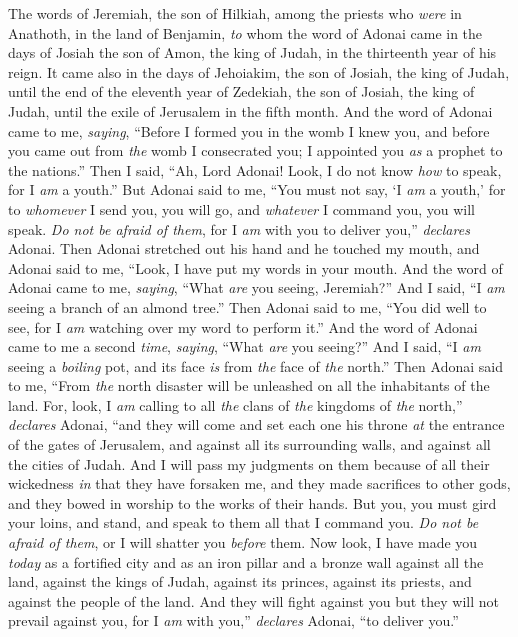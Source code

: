 
\begin{biblechapter} %
 The words of Jeremiah, the son of Hilkiah, among the priests who \textit{were} in Anathoth, in the land of Benjamin,
\verse \textit{to} whom the word of Adonai came in the days of Josiah the son of Amon, the king of Judah, in the thirteenth year of his reign.
\verse It came also in the days of Jehoiakim, the son of Josiah, the king of Judah, until the end of the eleventh year of Zedekiah, the son of Josiah, the king of Judah, until the exile of Jerusalem in the fifth month.
\verse And the word of Adonai came to me, \textit{saying},
\verse “Before I formed you in the womb I knew you, 
and before you came out from \textit{the} womb I consecrated you; 
I appointed you \textit{as} a prophet to the nations.”
\verse Then I said, “Ah, Lord Adonai! Look, I do not know \textit{how} to speak, for I \textit{am} a youth.”
\verse But Adonai said to me, “You must not say, ‘I \textit{am} a youth,’ for to \textit{whomever} I send you, you will go, and \textit{whatever} I command you, you will speak.
\verse \textit{Do not be afraid of them}, for I \textit{am} with you to deliver you,” \textit{declares} Adonai.
\verse Then Adonai stretched out his hand and he touched my mouth, and Adonai said to me,
\verse “Look, I have put my words in your mouth.
 And the word of Adonai came to me, \textit{saying}, “What \textit{are} you seeing, Jeremiah?” And I said, “I \textit{am} seeing a branch of an almond tree.”
\verse Then Adonai said to me, “You did well to see, for I \textit{am} watching over my word to perform it.”
\verse And the word of Adonai came to me a second \textit{time}, \textit{saying}, “What \textit{are} you seeing?” And I said, “I \textit{am} seeing a \textit{boiling} pot, and its face \textit{is} from \textit{the} face of \textit{the} north.”
\verse Then Adonai said to me, “From \textit{the} north disaster will be unleashed on all the inhabitants of the land.
\verse For, look, I \textit{am} calling to all \textit{the} clans of \textit{the} kingdoms of \textit{the} north,” \textit{declares} Adonai, “and they will come and set each one his throne \textit{at} the entrance of the gates of Jerusalem, and against all its surrounding walls, and against all the cities of Judah.
\verse And I will pass my judgments on them because of all their wickedness \textit{in} that they have forsaken me, and they made sacrifices to other gods, and they bowed in worship to the works of their hands.
\verse But you, you must gird your loins, and stand, and speak to them all that I command you. \textit{Do not be afraid of them}, or I will shatter you \textit{before} them.
\verse Now look, I have made you \textit{today} as a fortified city and as an iron pillar and a bronze wall against all the land, against the kings of Judah, against its princes, against its priests, and against the people of the land.
\verse And they will fight against you but they will not prevail against you, for I \textit{am} with you,” \textit{declares} Adonai, “to deliver you.”
\end{biblechapter}

